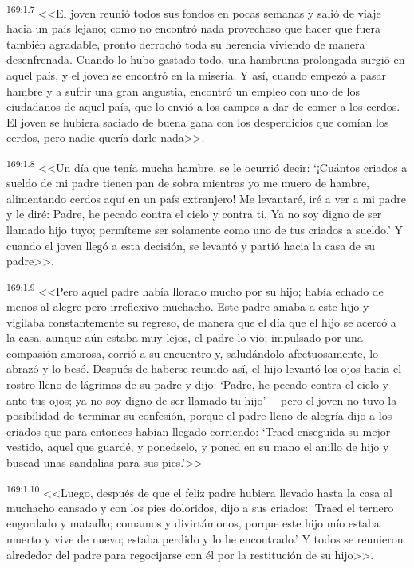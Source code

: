 \par 
\textsuperscript{169:1.7} <<El joven reunió todos sus fondos en pocas semanas y salió de viaje hacia un país lejano; como no encontró nada provechoso que hacer que fuera también agradable, pronto derrochó toda su herencia viviendo de manera desenfrenada. Cuando lo hubo gastado todo, una hambruna prolongada surgió en aquel país, y el joven se encontró en la miseria. Y así, cuando empezó a pasar hambre y a sufrir una gran angustia, encontró un empleo con uno de los ciudadanos de aquel país, que lo envió a los campos a dar de comer a los cerdos. El joven se hubiera saciado de buena gana con los desperdicios que comían los cerdos, pero nadie quería darle nada>>.

\par 
\textsuperscript{169:1.8} <<Un día que tenía mucha hambre, se le ocurrió decir: `¡Cuántos criados a sueldo de mi padre tienen pan de sobra mientras yo me muero de hambre, alimentando cerdos aquí en un país extranjero! Me levantaré, iré a ver a mi padre y le diré: Padre, he pecado contra el cielo y contra ti. Ya no soy digno de ser llamado hijo tuyo; permíteme ser solamente como uno de tus criados a sueldo.' Y cuando el joven llegó a esta decisión, se levantó y partió hacia la casa de su padre>>.

\par 
\textsuperscript{169:1.9} <<Pero aquel padre había llorado mucho por su hijo; había echado de menos al alegre pero irreflexivo muchacho. Este padre amaba a este hijo y vigilaba constantemente su regreso, de manera que el día que el hijo se acercó a la casa, aunque aún estaba muy lejos, el padre lo vio; impulsado por una compasión amorosa, corrió a su encuentro y, saludándolo afectuosamente, lo abrazó y lo besó. Después de haberse reunido así, el hijo levantó los ojos hacia el rostro lleno de lágrimas de su padre y dijo: `Padre, he pecado contra el cielo y ante tus ojos; ya no soy digno de ser llamado tu hijo' ---pero el joven no tuvo la posibilidad de terminar su confesión, porque el padre lleno de alegría dijo a los criados que para entonces habían llegado corriendo: `Traed enseguida su mejor vestido, aquel que guardé, y ponedselo, y poned en su mano el anillo de hijo y buscad unas sandalias para sus pies.'>>

\par 
\textsuperscript{169:1.10} <<Luego, después de que el feliz padre hubiera llevado hasta la casa al muchacho cansado y con los pies doloridos, dijo a sus criados: `Traed el ternero engordado y matadlo; comamos y divirtámonos, porque este hijo mío estaba muerto y vive de nuevo; estaba perdido y lo he encontrado.' Y todos se reunieron alrededor del padre para regocijarse con él por la restitución de su hijo>>.

